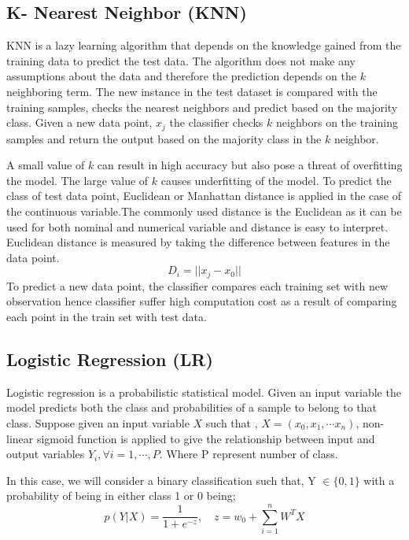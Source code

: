 \documentclass[final,5p,times,twocolumn,authoryear]{elsarticle}
\begin{document}
\subsection{K- Nearest Neighbor (KNN)}
KNN is a lazy learning algorithm that depends on the knowledge gained from the training data to predict the test data. The algorithm does not make any assumptions about the data and therefore the prediction depends on the $k$ neighboring term. The new instance in the test dataset is compared with the training samples, checks the nearest neighbors and predict based on the majority class. Given a new data point, $x_{j}$ the classifier checks $k$ neighbors on the training samples and return the output based on the majority class in the $k$ neighbor.


A small value of $k$ can result in high accuracy but also pose a threat of overfitting the model. The large value of $k$ causes underfitting of the model. To predict the class of test data point, Euclidean or Manhattan distance is applied in the case of the continuous variable.The commonly used distance is the Euclidean as it can be used for both nominal
and numerical variable and distance is easy to interpret. Euclidean distance is measured by taking the difference between features in the data point.
 \begin{equation}
 D_{i} = || x_{j} - x_{0} ||
 \end{equation}
To predict a new data point, the classifier compares each training set with new observation hence classifier suffer high computation cost as a result of comparing each point in the train set with test data. 
\subsection{Logistic Regression (LR)}
Logistic regression is a probabilistic statistical model. Given an input variable the model predicts both the class and probabilities of a sample to belong to that class. Suppose given an input variable $X$ such that , $X = (x_{0} , x_{1},\cdots x_{n})$, non-linear sigmoid function is applied to give the relationship between input  and  output variables $Y_{i}, \forall i = 1,\cdots,P $. Where P represent number of class. 

In this case, we will consider a binary classification such that, Y $ \in \{ 0,1\}$ with a probability of being in either class 1 or 0 being;
\begin{equation}
p(Y| X) = \frac{1}{ 1 + e^{-z}}, \quad z = w_{0} + \sum_{i = 1}^{n} W^{T}X
\end{equation}
\end{document}
